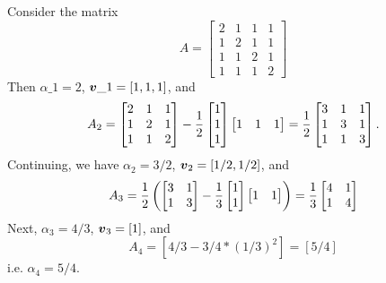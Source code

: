 \begin{example} Consider the matrix
\[
A = \begin{bmatrix}
2 &1 &1 &1 \\
1 & 2 & 1 & 1 \\
1 & 1 & 2 & 1 \\
1 & 1 & 1 & 2
\end{bmatrix}
\]
Then $\ensuremath{\alpha}\ensuremath{\_1} = 2$, $\bm{{\mbox{\boldmath$v$\unboldmath}}}\_1 = [1,1,1]$, and  
\[
A_2 = \begin{bmatrix}
2 &1 &1 \\
1 & 2 & 1 \\
1 & 1 & 2 
\end{bmatrix} - {1 \over 2} \begin{bmatrix} 1 \\ 1 \\ 1 \end{bmatrix} \begin{bmatrix} 1 & 1 & 1 \end{bmatrix} 
={1 \over 2} \begin{bmatrix}
3 & 1 & 1 \\
1 & 3 & 1 \\
1 & 1 & 3 
\end{bmatrix}.
\]
Continuing, we have $\ensuremath{\alpha}_2 = 3/2$, $\bm{{\mbox{\boldmath$v$\unboldmath}}}_2 = [1/2,1/2]$, and
\[
A_3 = {1 \over 2} \left( \begin{bmatrix}
3 & 1 \\ 1 & 3
\end{bmatrix} - {1 \over 3} \begin{bmatrix} 1 \\ 1  \end{bmatrix} \begin{bmatrix} 1 & 1  \end{bmatrix}
\right)
= {1 \over 3} \begin{bmatrix} 4 & 1 \\ 1 & 4 \end{bmatrix}
\]
Next, $\ensuremath{\alpha}_3 = 4/3$, $\bm{{\mbox{\boldmath$v$\unboldmath}}}_3 = [1]$, and
\[
A_4 = [4/3 - 3/4 * (1/3)^2] = [5/4]
\]
i.e. $\ensuremath{\alpha}_4 = 5/4$.


\end{example}
